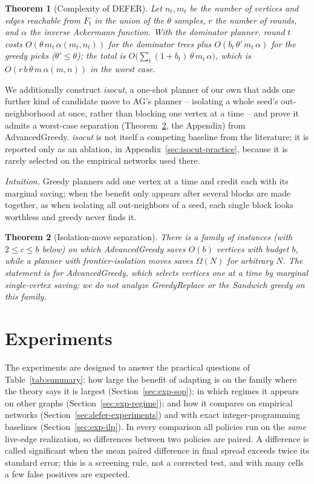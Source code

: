 \documentclass[preprint,11pt]{elsarticle}
\newtheorem{theorem}{Theorem}
\theoremstyle{definition}
\theoremstyle{remark}
\begin{document}
\begin{theorem}[Complexity of DEFER]\label{thm:defer-complexity}
Let $n_t,m_t$ be the number of vertices and edges reachable from $F_t$ in
the union of the $\theta$ samples, $r$ the number of rounds, and $\alpha$
the inverse Ackermann function. With the dominator planner, round $t$ costs
$O(\theta\,m_t\,\alpha(m_t,n_t))$ for the dominator trees plus
$O(b_t\,\theta'\,m_t\,\alpha)$ for the greedy picks ($\theta'\le\theta$);
the total is $O\bigl(\sum_t(1+b_t)\,\theta\,m_t\,\alpha\bigr)$, which is
$O(r\,b\,\theta\,m\,\alpha(m,n))$ in the worst case.
\end{theorem}

We additionally construct \emph{isocut}, a one-shot planner of our own
that adds one further kind of candidate move to AG's planner --
isolating a whole seed's out-neighborhood at once, rather than blocking
one vertex at a time -- and prove it admits a worst-case separation
(Theorem~\ref{thm:isocut-separation}, the Appendix) from AdvancedGreedy. \emph{isocut} is not itself a competing baseline from the
literature; it is reported only as an ablation, in
Appendix~\ref{sec:isocut-practice}, because it is rarely selected
on the empirical networks used there.

\emph{Intuition.} Greedy planners add one vertex at a time and credit each
with its marginal saving; when the benefit only appears after several
blocks are made together, as when isolating all out-neighbors of a seed, each
single block looks worthless and greedy never finds it.

\begin{theorem}[Isolation-move separation]\label{thm:isocut-separation}
There is a family of instances (with $2\le c\le b$ below) on which AdvancedGreedy saves $O(b)$ vertices with budget $b$,
while a planner with frontier-isolation moves saves $\Omega(N)$ for
arbitrary $N$. The statement is for AdvancedGreedy, which selects vertices one at a time by marginal single-vertex saving; we do not analyze GreedyReplace or the Sandwich greedy on this family.
\end{theorem}

\section{Experiments}\label{sec:experiments}

The experiments are designed to answer the practical questions of Table~\ref{tab:summary}: how large the benefit of adapting is on the family where the theory says it is largest (Section~\ref{sec:exp-sop}); in which regimes it appears on other graphs (Section~\ref{sec:exp-regime}); and how it compares on empirical networks (Section~\ref{sec:defer-experiments}) and with exact integer-programming baselines (Section~\ref{sec:exp-ilp}). In every comparison all policies run on the \emph{same} live-edge realization, so differences between two policies are paired. A difference is called significant when the mean paired difference in final spread exceeds twice its standard error; this is a screening rule, not a corrected test, and with many cells a few false positives are expected.
\end{document}
